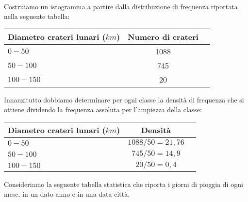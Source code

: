 \begin{exrig}
 \begin{esempio}

Costruiamo un istogramma a partire dalla distribuzione di frequenza riportata nella seguente tabella:
\begin{center}
\begin{tabular}{lcc}
\toprule
Diametro crateri lunari ($\unit{km}$) & Numero di crateri\\
\midrule
$0-50$ & 1088 \\
$50-100$ & 745 \\
$100-150$ & 20 \\
\bottomrule
\end{tabular}
\end{center}

Innanzitutto dobbiamo determinare per ogni classe la densità di frequenza che si ottiene dividendo la frequenza assoluta per l'ampiezza della classe:

\begin{center}
\begin{tabular}{lcc}
\toprule
Diametro crateri lunari ($\unit{km}$) & Densità\\
\midrule
$0-50$ & $1088/50=21,76$ \\
$50-100$ & $745/50=14,9$ \\
$100-150$ & $20/50=0,4$ \\
\bottomrule
\end{tabular}


\end{center}
\end{esempio}

\begin{esempio}
Consideriamo la seguente tabella statistica che riporta i giorni di pioggia di ogni mese, in un dato anno e in una data città.


\end{esempio}
\end{exrig}
